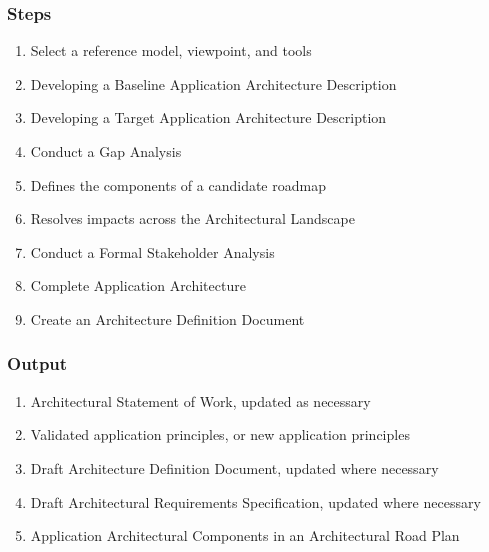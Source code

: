 \documentclass[aspectratio=169, table]{beamer}
\begin{document}
    \begin{frame}
        \frametitle{Steps}
        \vspace{10pt}
        \begin{enumerate}
            \item Select a reference model, viewpoint, and tools
            \item Developing a Baseline Application Architecture Description
            \item Developing a Target Application Architecture Description
            \item Conduct a Gap Analysis
            \item Defines the components of a candidate roadmap
            \item Resolves impacts across the Architectural Landscape
            \item Conduct a Formal Stakeholder Analysis
            \item Complete Application Architecture
            \item Create an Architecture Definition Document
        \end{enumerate}
    \end{frame}

    \begin{frame}
        \frametitle{Output}
        \begin{enumerate}
            \item Architectural Statement of Work, updated as necessary
            \item Validated application principles, or new application principles
            \item Draft Architecture Definition Document, updated where necessary
            \item Draft Architectural Requirements Specification, updated where necessary
            \item Application Architectural Components in an Architectural Road Plan
        \end{enumerate}
    \end{frame}
\end{document}
